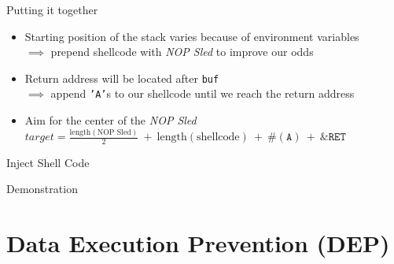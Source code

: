 \documentclass[beamer]{uibk}
\begin{document}
\begin{frame}[fragile]{Putting it together}
    \begin{itemize}
        \item Starting position of the stack varies because of environment
            variables\\
            \medskip
            $\implies$ prepend shellcode with \textit{NOP Sled} to improve our
            odds
        \bigskip
        \item Return address will be located after \texttt{buf}\\
            \medskip
            $\implies$ append \texttt{'A'}s to our shellcode until we reach the
            return address
        \bigskip
        \item Aim for the center of the \textit{NOP Sled}\\
            \medskip
            $\mathit{target} = \frac{\mathrm{length}(\text{NOP Sled})}{2}\ +\ \mathrm{length}(\text{shellcode})\ +\ \#(\texttt{A})\ +\ \texttt{\&RET}$
   \end{itemize}
   \begin{center}
       
   \end{center}
\end{frame}

\begin{frame}{Inject Shell Code}
    \begin{center}
        \huge Demonstration
    \end{center}
\end{frame}

\section{Data Execution Prevention (DEP)}
\end{document}
